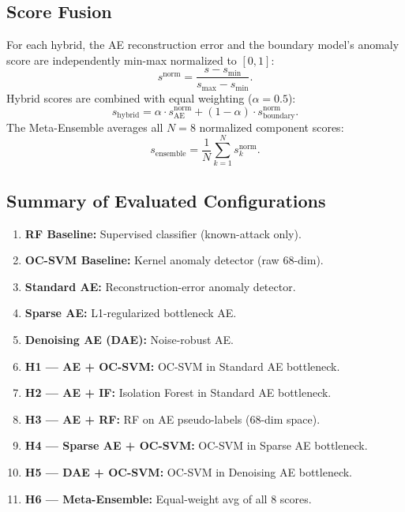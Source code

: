 \documentclass[10pt,journal,compsoc]{IEEEtran}
\begin{document}
\subsection{Score Fusion}

For each hybrid, the AE reconstruction error and the boundary model's
anomaly score are independently min-max normalized to $[0,1]$:
\begin{equation}
  s^{\text{norm}} = \frac{s - s_{\min}}{s_{\max} - s_{\min}}.
\end{equation}
Hybrid scores are combined with equal weighting ($\alpha = 0.5$):
\begin{equation}
  s_{\text{hybrid}} = \alpha \cdot s_{\text{AE}}^{\text{norm}}
    + (1-\alpha) \cdot s_{\text{boundary}}^{\text{norm}}.
\end{equation}
The Meta-Ensemble averages all $N=8$ normalized component scores:
\begin{equation}
  s_{\text{ensemble}} = \frac{1}{N}\sum_{k=1}^{N}
    s_k^{\text{norm}}.
\end{equation}

\subsection{Summary of Evaluated Configurations}

\begin{enumerate}[leftmargin=*,noitemsep,topsep=2pt]
  \item \textbf{RF Baseline:} Supervised classifier (known-attack only).
  \item \textbf{OC-SVM Baseline:} Kernel anomaly detector (raw 68-dim).
  \item \textbf{Standard AE:} Reconstruction-error anomaly detector.
  \item \textbf{Sparse AE:} L1-regularized bottleneck AE.
  \item \textbf{Denoising AE (DAE):} Noise-robust AE.
  \item \textbf{H1 — AE + OC-SVM:} OC-SVM in Standard AE bottleneck.
  \item \textbf{H2 — AE + IF:} Isolation Forest in Standard AE bottleneck.
  \item \textbf{H3 — AE + RF:} RF on AE pseudo-labels (68-dim space).
  \item \textbf{H4 — Sparse AE + OC-SVM:} OC-SVM in Sparse AE bottleneck.
  \item \textbf{H5 — DAE + OC-SVM:} OC-SVM in Denoising AE bottleneck.
  \item \textbf{H6 — Meta-Ensemble:} Equal-weight avg of all 8 scores.
\end{enumerate}
\end{document}
